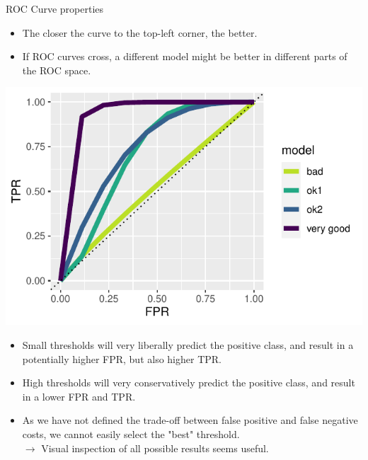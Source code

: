 \documentclass[11pt,compress,t,notes=noshow, xcolor=table]{beamer}
\begin{document}
\begin{vbframe}{ROC Curve properties}

\begin{minipage}[c]{0.5\textwidth}
  \begin{itemize}
    \item The closer the curve to the top-left corner, the better.
    \item If ROC curves cross, a different model might be better in different 
    parts of the ROC space.
\end{itemize}
\end{minipage}%
\begin{minipage}[c]{0.5\textwidth}
  \centering 
  \includegraphics[width=\textwidth]{figure/eval_mclass_roc_sp_12}
\end{minipage}

\lz

\begin{itemize}
  \item Small thresholds will very liberally predict the positive class, and 
  result in a potentially higher FPR, but also higher TPR.
  \item High thresholds will very conservatively predict the positive class, 
  and result in a lower FPR and TPR.
  \item As we have not defined the trade-off between false positive and false 
  negative costs, we cannot easily select the "best" threshold. \\
  $\rightarrow$ Visual inspection of all possible results seems useful.
\end{itemize}

% 


\end{vbframe}
\end{document}
